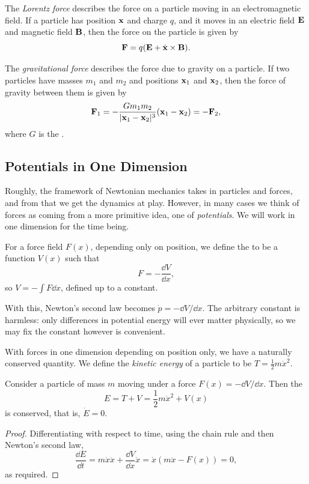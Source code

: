 \documentclass[a4paper]{scrartcl}
\begin{document}
The \emph{Lorentz force} describes the force on a particle moving in an electromagnetic field. If a particle has position $\mathbf{x}$ and charge $q$, and it moves in an electric field $\mathbf{E}$ and magnetic field $\mathbf{B}$, then the force on the particle is given by
$$
\mathbf{F} = q(\mathbf{E} + \dot{\mathbf{x}} \times \mathbf{B}).
$$


The \emph{gravitational force} describes the force due to gravity on a particle. If two particles have masses $m_1$ and $m_2$ and positions $\mathbf{x}_1$ and $\mathbf{x}_2$, then the force of gravity between them is given by
$$
\mathbf{F}_1 = - \frac{G m_1 m_2}{| \mathbf{x}_1 - \mathbf{x}_2|^3} (\mathbf{x}_1 - \mathbf{x}_2) = - \mathbf{F}_2,
$$
where $G$ is the .


\subsection{Potentials in One Dimension}

Roughly, the framework of Newtonian mechanics takes in particles and forces, and from that we get the dynamics at play. However, in many cases we think of forces as coming from a more primitive idea, one of \emph{potentials}. We will work in one dimension for the time being.

\begin{definition}
	For a force field $F(x)$, depending only on position, we define the  to be a function $V(x)$ such that
	$$
	F = - \frac{\dd V}{\dd x},
	$$
	so $V = -\int F \dd x$, defined up to a constant.
\end{definition}

With this, Newton's second law becomes $\dot{p} = -\dd V/\dd x$. The arbitrary constant is harmless: only differences in potential energy will ever matter physically, so we may fix the constant however is convenient.

With forces in one dimension depending on position only, we have a naturally conserved quantity. We define the \emph{kinetic energy} of a particle to be $T = \frac{1}{2}m \dot{x}^2$.

\begin{proposition}
	Consider a particle of mass $m$ moving under a force $F(x) = -\dd V/\dd x$. Then the 
	$$
	E = T + V = \frac{1}{2}m\dot{x}^2 + V(x)
	$$
	is conserved, that is, $\dot{E} = 0$.
\end{proposition}
\begin{proof}
	Differentiating with respect to time, using the chain rule and then Newton's second law,
	$$
	\frac{\dd E}{\dd t} = m \dot{x} \ddot{x} + \frac{\dd V}{\dd x}\dot{x} = \dot{x}\left(m \ddot{x} - F(x)\right) = 0,
	$$
	as required.
\end{proof}
\end{document}
